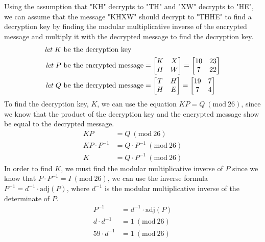 \documentclass{../mathhomework}
\newcommand{\Mod}[1]{\ (\mathrm{mod}\ #1)}
\newcommand{\Adj}[1]{\mathrm{adj}(#1)}
\begin{document}
\begin{problem}
    \begin{solution}
        Using the assumption that "KH" decrypts to "TH" and "XW" decrypts to "HE", we can assume that the message "KHXW" should decrypt to "THHE" to find a decryption key by finding the modular
        multiplicative inverse of the encrypted message and multiply it with the decrypted message to find the decryption key.
        \begin{align}
            \textit{let } K &\text{ be the decryption key} \\
            \textit{let } P &\text{ be the encrypted message} = \begin{bmatrix}
                K & X \\ H & W
            \end{bmatrix} = \begin{bmatrix}
                10 & 23 \\ 7 & 22
            \end{bmatrix}\\
            \textit{let } Q &\text{ be the decrypted message} = \begin{bmatrix}
                T & H \\ H & E
            \end{bmatrix} = \begin{bmatrix}
                19 & 7 \\ 7 & 4
            \end{bmatrix}
        \end{align}
        To find the decryption key, $K$, we can use the equation $KP = Q \Mod{26}$, since we know that the product of the decryption key and the encrypted message show be equal
        to the decrypted message.
        \begin{align}
            KP & = Q \Mod{26}\\
            KP \cdot P^{-1} &= Q \cdot P^{-1} \Mod{26}\\
            K & = Q \cdot P^{-1} \Mod{26}
        \end{align}
        In order to find $K$, we must find the modular multiplicative inverse of $P$ since we know that $P \cdot P^{-1} = I \Mod{26}$, we can use the inverse formula $P^{-1} = d^{-1} \cdot \Adj{P}$, where $d^{-1}$ is the modular multiplicative inverse of the determinate of $P$.
        \begin{align}
            P^{-1} & = d^{-1} \cdot \Adj{P} \\
            d \cdot d^{-1} & = 1 \Mod{26} \\
            59 \cdot d^{-1} & = 1 \Mod{26} \\

\end{align}
\end{solution}
\end{problem}
\end{document}
